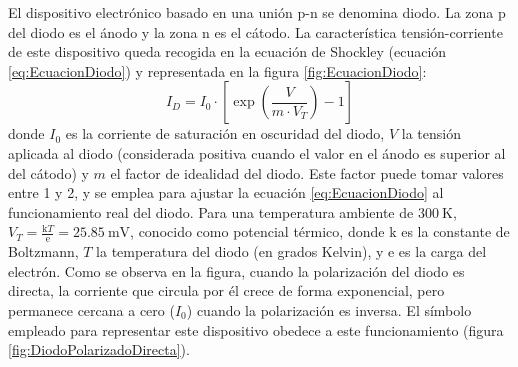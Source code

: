El dispositivo electrónico basado en una unión p-n se denomina diodo.
La zona p del diodo es el ánodo y la zona n es el cátodo. La característica
tensión-corriente de este dispositivo queda recogida en la ecuación
de Shockley (ecuación \ref{eq:EcuacionDiodo}) y representada en la
figura \ref{fig:EcuacionDiodo}:\begin{equation}
I_{D}=I_{0}\cdot[\exp(\frac{V}{m\cdot V_{T}})-1]\label{eq:EcuacionDiodo}\end{equation}
donde
$I_{0}$
es la corriente de saturación en oscuridad del diodo, $V$ la tensión
aplicada al diodo (considerada positiva cuando el valor en el ánodo
es superior al del cátodo) y $m$
el factor de idealidad del diodo. Este factor puede tomar valores
entre 1 y 2, y se emplea para ajustar la ecuación \ref{eq:EcuacionDiodo}
al funcionamiento real del diodo. Para una temperatura ambiente de
$\SI{300}{\kelvin}$, $V_{T}=\frac{\mathrm{k}T}{\mathrm{e}}=\SI{25.85}{\milli\volt}$,
conocido como potencial térmico, donde $\mathrm{k}$
es la constante de Boltzmann, $T$ la temperatura del diodo (en grados
Kelvin), y $\mathrm{e}$ es la carga del electrón. Como se observa
en la figura, cuando la polarización del diodo es directa, la corriente
que circula por él crece de forma exponencial, pero permanece cercana
a cero ($I_{0}$) cuando la polarización es inversa. El símbolo empleado
para representar este dispositivo obedece a este funcionamiento (figura
\ref{fig:DiodoPolarizadoDirecta}).

